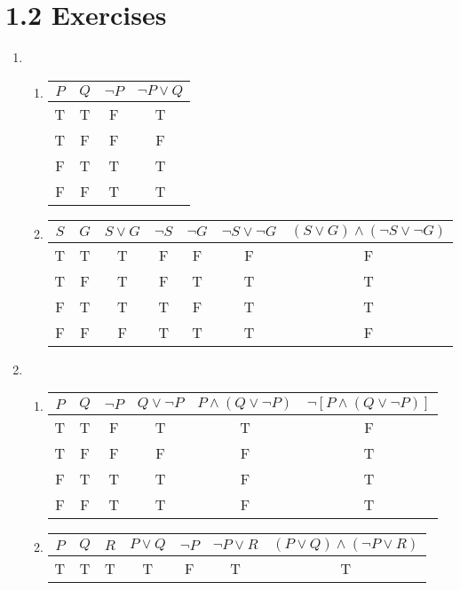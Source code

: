 \documentclass{article}
\begin{document}
\section*{1.2 Exercises}
\begin{enumerate}
\item
  \begin{enumerate}
  \item
    \begin{tabular}{c c c c}
      $P$ & $Q$ & $\lnot P$ & $\lnot P \lor Q$ \\ \hline
      T & T & F & T \\
      T & F & F & F \\
      F & T & T & T \\
      F & F & T & T \\
    \end{tabular}
  \item
    \begin{tabular}{c c c c c c c}
      $S$ & $G$ & $S \lor G$ & $\lnot S$ & $\lnot G$ & $\lnot S \lor \lnot G$ & $(S \lor G) \land (\lnot S \lor \lnot G)$ \\ \hline
      T & T & T & F & F & F & F \\
      T & F & T & F & T & T & T \\
      F & T & T & T & F & T & T \\
      F & F & F & T & T & T & F \\
    \end{tabular}
  \end{enumerate}
\item
  \begin{enumerate}
  \item
    \begin{tabular}{c c c c c c}
      $P$ & $Q$ & $\lnot P$ & $Q \lor \lnot P$ & $P \land (Q \lor \lnot P)$ & $\lnot [P \land (Q \lor \lnot P)]$ \\ \hline
      T & T & F & T & T & F \\
      T & F & F & F & F & T \\
      F & T & T & T & F & T \\
      F & F & T & T & F & T \\
    \end{tabular}
\item
    \begin{tabular}{c c c c c c c}
      $P$ & $Q$ & $R$ & $P \lor Q$ & $\lnot P$ & $\lnot P \lor R$ & $(P \lor Q) \land (\lnot P \lor R)$ \\ \hline
      T & T & T & T & F & T & T \\

\end{tabular}
\end{enumerate}
\end{enumerate}
\end{document}
